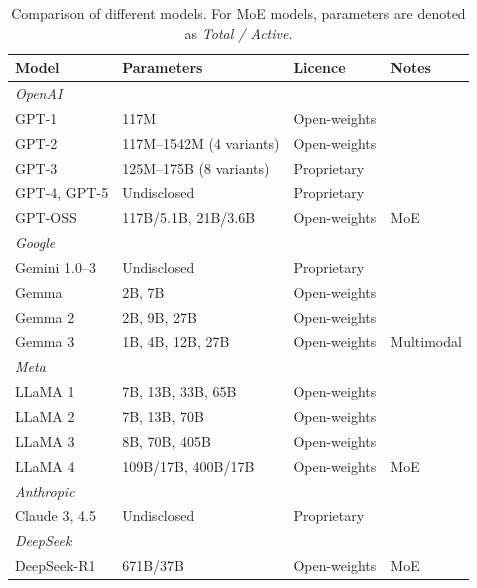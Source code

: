 \begin{table}
\centering
\small
\caption{Comparison of different models. For \ac{MoE} models, parameters are denoted as \textit{Total / Active}.}
\label{tab:llm-parameters}
\begin{tabular}{llll}
\toprule
\textbf{Model} & \textbf{Parameters} & \textbf{Licence} & \textbf{Notes} \\
\midrule
\multicolumn{4}{l}{\textit{OpenAI}} \\
GPT-1 & 117M & Open-weights & \cite{Radford2018ImprovingLU, Radford2019LanguageMA} \\
GPT-2 & 117M--1542M (4 variants) & Open-weights & \cite{Radford2019LanguageMA} \\
GPT-3 & 125M--175B (8 variants) & Proprietary & \cite{NEURIPS2020_1457c0d6} \\
GPT-4, GPT-5 & Undisclosed & Proprietary & \cite{openai2024gpt4technicalreport, singh2025openaigpt5card} \\
GPT-OSS & 117B/5.1B, 21B/3.6B & Open-weights & MoE \cite{openai2025gptoss120bgptoss20bmodel} \\
\midrule
\multicolumn{4}{l}{\textit{Google}} \\
Gemini 1.0--3 & Undisclosed & Proprietary & \cite{geminiteam2025geminifamilyhighlycapable, comanici2025gemini25pushingfrontier, google2025gemini3} \\
Gemma & 2B, 7B & Open-weights & \cite{gemmateam2024gemmaopenmodelsbased} \\
Gemma 2 & 2B, 9B, 27B & Open-weights & \cite{gemmateam2024gemma2improvingopen} \\
Gemma 3 & 1B, 4B, 12B, 27B & Open-weights & Multimodal \cite{gemmateam2025gemma3technicalreport} \\
\midrule
\multicolumn{4}{l}{\textit{Meta}} \\
LLaMA 1 & 7B, 13B, 33B, 65B & Open-weights & \cite{touvron2023llamaopenefficientfoundation} \\
LLaMA 2 & 7B, 13B, 70B & Open-weights & \cite{touvron2023llama2openfoundation} \\
LLaMA 3 & 8B, 70B, 405B & Open-weights & \cite{grattafiori2024llama3herdmodels} \\
LLaMA 4 & 109B/17B, 400B/17B & Open-weights & MoE \cite{meta2025llama4} \\
\midrule
\multicolumn{4}{l}{\textit{Anthropic}} \\
Claude 3, 4.5 & Undisclosed & Proprietary & \cite{TheC3, anthropic2025claudesonnet45systemcard, anthropic2025claudeopus45systemcard} \\
\midrule
\multicolumn{4}{l}{\textit{DeepSeek}} \\
DeepSeek-R1 & 671B/37B & Open-weights & MoE \cite{Guo_2025} \\
\bottomrule
\end{tabular}
\end{table}

